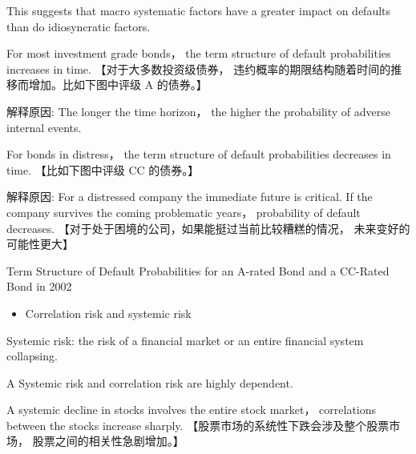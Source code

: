 This suggests that macro systematic factors have a greater impact on defaults than do idiosyncratic factors.

For most investment grade bonds， the term structure of default probabilities increases in time. 【对于大多数投资级债券， 违约概率的期限结构随着时间的推移而增加。比如下图中评级 A 的债券。】

解释原因: The longer the time horizon， the higher the probability of adverse internal events.

For bonds in distress， the term structure of default probabilities decreases in time. 【比如下图中评级 CC 的债券。】

解释原因: For a distressed company the immediate future is critical. If the company survives the coming problematic years， probability of default decreases. 【对于处于困境的公司，如果能挺过当前比较糟糕的情况， 未来变好的可能性更大】

\begin{center}
\end{center}

Term Structure of Default Probabilities for an A-rated Bond and a CC-Rated Bond in 2002

\begin{itemize}
\item Correlation risk and systemic risk
\end{itemize}

 Systemic risk: the risk of a financial market or an entire financial system collapsing.

A Systemic risk and correlation risk are highly dependent.

A systemic decline in stocks involves the entire stock market， correlations between the stocks increase sharply. 【股票市场的系统性下跌会涉及整个股票市场， 股票之间的相关性急剧增加。】

